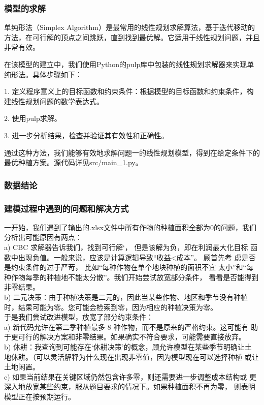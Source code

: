 \documentclass{cumcmthesis}
\begin{document}
\subsubsection{模型的求解}
单纯形法（Simplex Algorithm）是最常用的线性规划求解算法，基于迭代移动的方法，在可行解的顶点之间跳跃，直到找到最优解。它适用于线性规划问题，并且非常有效。

在该模型的建立中，我们使用Python的pulp库中包装的线性规划求解器来实现单纯形法。具体步骤如下：

1. 定义程序意义上的目标函数和约束条件：根据模型的目标函数和约束条件，构建线性规划问题的数学表达式。

2. 使用pulp求解。

3. 进一步分析结果，检查并验证其有效性和正确性。

通过这种方法，我们能够有效地求解问题一的线性规划模型，得到在给定条件下的最优种植方案。源代码详见src/main\_1.py。

\subsubsection{数据结论}

\subsubsection{建模过程中遇到的问题和解决方式}
一开始，我们遇到了输出的.xlsx文件中所有作物的种植面积全部为0的问题，我们分析出可能原因有两点：\\
a) CBC 求解器告诉我们，找到可行解‘， 但是该解为负，即在利润最大化目标
函数中出现负值。一般来说，应该是计算逻辑导致“收益<成本”。 顾首先考
虑是否是约束条件的过于严苛， 比如“每种作物在单个地块种植的面积不宜
太小”和“每种作物每季的种植地不能太分散”。我们开始尝试放宽部分条件，
看看是否能得到非零结果。\\
b) 二元决策：由于种植决策是二元的，因此当某些作物、地区和季节没有种植
时，结果可能为零。您可能会检索到零，因为相应的种植决策为零。\\

于是我们尝试改进模型，放宽了部分约束条件：\\
a) 新代码允许在第二季种植最多 8 种作物，而不是原来的严格约束。这可能有
助于更可行的解决方案和非零结果。如果确实不符合要求，可能需要直接放弃。 \\
b) 休耕：我查询到可能存在‘休耕决策’的概念，顾允许模型在某些季节明确让土
地休耕。（可以灵活解释为什么现在出现非零值，因为模型现在可以选择种植
或让土地闲置。 \\
c) 如果当前结果在关键区域仍然包含许多零，则还需要进一步调整成本结构或
更深入地放宽某些约束，服从题目要求的情况下。如果种植面积不再为零，
则表明模型正在按预期运行。 \\
\end{document}
